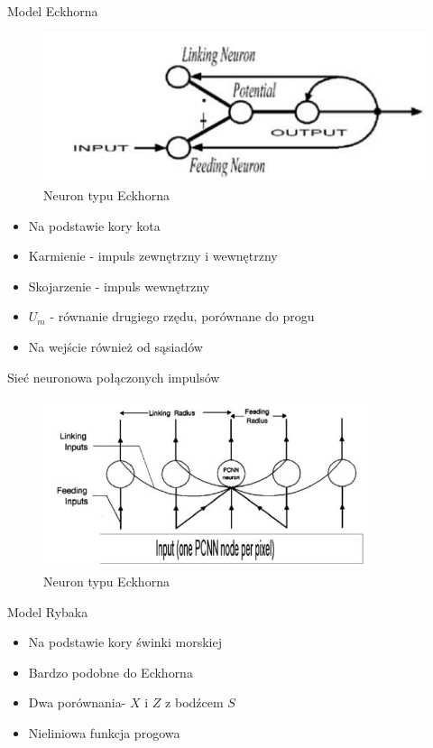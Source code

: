 \documentclass{beamer}
\begin{document}
\begin{frame}{Model Eckhorna}
\begin{figure}[ht]
	\begin{minipage}{0.48\linewidth}
	\centering
	\includegraphics[width=\textwidth]{EckhornNeuron.png}
	\caption{Neuron typu Eckhorna}
	\end{minipage}
\end{figure}
\begin{itemize}
\item Na podstawie kory kota
\item Karmienie - impuls zewnętrzny i wewnętrzny
\item Skojarzenie - impuls wewnętrzny
\item $U_m$ - równanie drugiego rzędu, porównane do progu
\item Na wejście również od sąsiadów
\end{itemize}
\end{frame}
\begin{frame}
Sieć neuronowa połączonych impulsów
\begin{figure}[ht]
	\centering
	\includegraphics[width=0.85\textwidth]{PCNN.png}
	\caption{Neuron typu Eckhorna}
\end{figure}
\end{frame}

\begin{frame}{Model Rybaka}
\begin{itemize}
\item Na podstawie kory świnki morskiej
\item Bardzo podobne do Eckhorna
\item Dwa porównania- $X$ i $Z$ z bodźcem $S$
\item Nieliniowa funkcja progowa
\end{itemize}
\end{frame}
\end{document}
